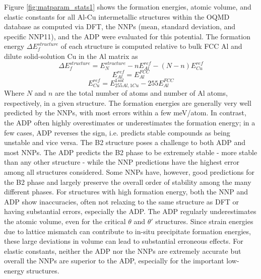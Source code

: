 \documentclass{article}
\begin{document}
Figure \ref{fig:matparam_stats1} shows the formation energies, atomic volume, and elastic constants for all Al-Cu intermetallic structures within the OQMD database as computed via DFT, the NNPs (mean, standard deviation, and specific NNP11), and the ADP were evaluated for this potential.
The formation energy $\Delta E^{structure}_f$ of each structure is computed relative to bulk FCC Al and dilute solid-solution Cu in the Al matrix as
\begin{equation} \label{eqn:formE_structure}
\Delta E^{structure}_f = E^{structure}_N - nE^{ref}_{Al}-(N-n)E^{ref}_{Cu}
\end{equation}
\begin{equation} \label{eqn:formRef_Al}
E^{ref}_{Al} = E^{FCC}_{Al}
\end{equation}
\begin{equation} \label{eqn:formRef_Cu}
E^{ref}_{Cu} = E^{1sol}_{255Al,1Cu} - 255E^{FCC}_{Al}
\end{equation}
Where $N$ and $n$ are the total number of atoms and number of Al atoms, respectively, in a given structure. The formation energies are generally very well predicted by the NNPs, with most errors within a few meV/atom.  In contrast, the ADP often highly overestimates or underestimates the formation energy;
in a few cases, ADP reverses the sign, i.e. predicts stable compounds as being unstable and vice versa.  The B2 structure poses a challenge to both ADP and most NNPs.  The ADP predicts the B2 phase to be extremely stable - more stable than any other structure - while the NNP predictions have the highest error among all structures considered.  Some NNPs have, however, good predictions for the B2 phase and largely preserve the overall order of stability among the many different phases.  For structures with high formation energy, both the NNP and ADP show inaccuracies, often not relaxing to the same structure as DFT or having substantial errors, especially the ADP.  The ADP regularly underestimates the atomic volume, even for the critical $\theta$ and $\theta'$ structures.  Since strain energies due to lattice mismatch can contribute to in-situ precipitate formation energies, these large deviations in volume can lead to substantial erroneous effects.  
For elastic constants, neither the ADP nor the NNPs are extremely accurate but overall the NNPs are superior to the ADP, especially for the important low-energy structures. 
\end{document}

